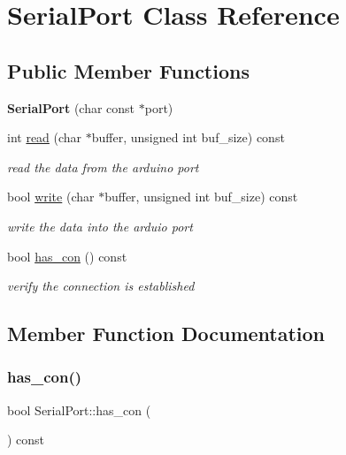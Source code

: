 \hypertarget{classSerialPort}{}\section{Serial\+Port Class Reference}
\label{classSerialPort}
\subsection*{Public Member Functions}
\begin{DoxyCompactItemize}
\item 
\mbox{\label{classSerialPort_a08005bc6269ad868425ef351dcf982ad}} 
{\bfseries Serial\+Port} (char const $\ast$port)
\item 
int \mbox{\hyperlink{classSerialPort_a23cbb94f2cc75c9f0d40735dfb6e1558}{read}} (char $\ast$buffer, unsigned int buf\+\_\+size) const
\begin{DoxyCompactList}\small\item\em read the data from the arduino port \end{DoxyCompactList}\item 
bool \mbox{\hyperlink{classSerialPort_aacd98ecf14374a7776efe2a11ec6a541}{write}} (char $\ast$buffer, unsigned int buf\+\_\+size) const
\begin{DoxyCompactList}\small\item\em write the data into the arduio port \end{DoxyCompactList}\item 
bool \mbox{\hyperlink{classSerialPort_a396d905aa4b7bc7c1c8593a971b89ce1}{has\+\_\+con}} () const
\begin{DoxyCompactList}\small\item\em verify the connection is established \end{DoxyCompactList}\end{DoxyCompactItemize}


\subsection{Member Function Documentation}
\mbox{\label{classSerialPort_a396d905aa4b7bc7c1c8593a971b89ce1}} 
\subsubsection{\texorpdfstring{has\+\_\+con()}{has\_con()}}
{\footnotesize\ttfamily bool Serial\+Port\+::has\+\_\+con (\begin{DoxyParamCaption}{ }\end{DoxyParamCaption}) const}



